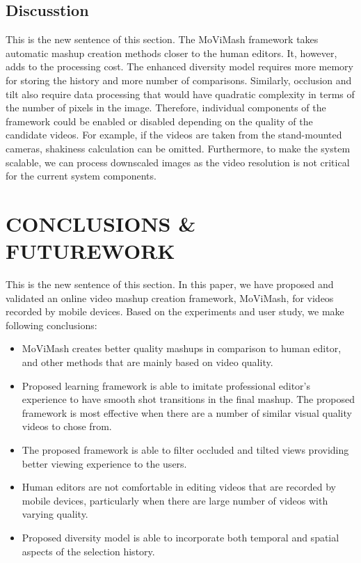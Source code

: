 \documentclass{sig-alternate}
\begin{document}
{{{\subsection{Discusstion}
This is the new sentence of this section.
The MoViMash framework takes automatic mashup creation methods
closer to the human editors. It, however, adds to the processing
cost. The enhanced diversity model requires more memory for storing
the history and more number of comparisons. Similarly, occlusion
and tilt also require data processing that would have quadratic
complexity in terms of the number of pixels in the image. Therefore,
individual components of the framework could be enabled or
disabled depending on the quality of the candidate videos. For example,
if the videos are taken from the stand-mounted cameras,
shakiness calculation can be omitted. Furthermore, to make the
system scalable, we can process downscaled images as the video
resolution is not critical for the current system components.

\section{CONCLUSIONS & FUTUREWORK}
This is the new sentence of this section.
In this paper, we have proposed and validated an online video
mashup creation framework, MoViMash, for videos recorded by
mobile devices. Based on the experiments and user study, we make
following conclusions:
\begin{itemize}
    \item MoViMash creates better quality mashups in comparison to
human editor, and other methods that are mainly based on
video quality.
    \item Proposed learning framework is able to imitate professional
editor’s experience to have smooth shot transitions in the final
mashup. The proposed framework is most effective when there are a number of similar visual quality videos to chose
from.
  \item The proposed framework is able to filter occluded and tilted
views providing better viewing experience to the users.
  \item Human editors are not comfortable in editing videos that are
recorded by mobile devices, particularly when there are large
number of videos with varying quality.
  \item  Proposed diversity model is able to incorporate both temporal
and spatial aspects of the selection history.
\end{itemize}

}}}
\end{document}
